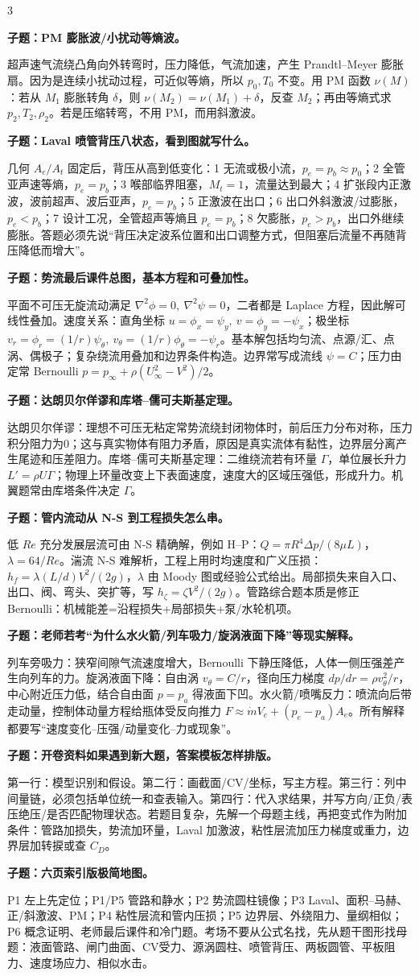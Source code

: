\documentclass[a4paper]{article}
\newcommand{\qt}[1]{\vspace{0.25pt}\colorbox{Q}{\parbox{\dimexpr\linewidth-2\fboxsep}{\color{white}\bfseries #1}}\par}
\newcommand{\ans}[1]{\colorbox{G}{\parbox{\dimexpr\linewidth-2\fboxsep}{#1}}\par}
\begin{document}
\begin{multicols}{3}
\qt{子题：PM 膨胀波/小扰动等熵波。}
\ans{超声速气流绕凸角向外转弯时，压力降低，气流加速，产生 Prandtl--Meyer 膨胀扇。因为是连续小扰动过程，可近似等熵，所以 $p_0,T_0$ 不变。用 PM 函数 $\nu(M)$：若从 $M_1$ 膨胀转角 $\delta$，则 $\nu(M_2)=\nu(M_1)+\delta$，反查 $M_2$；再由等熵式求 $p_2,T_2,\rho_2$。若是压缩转弯，不用 PM，而用斜激波。}
\qt{子题：Laval 喷管背压八状态，看到图就写什么。}
\ans{几何 $A_e/A_t$ 固定后，背压从高到低变化：1 无流或极小流，$p_e=p_b\approx p_0$；2 全管亚声速等熵，$p_e=p_b$；3 喉部临界阻塞，$M_t=1$，流量达到最大；4 扩张段内正激波，波前超声、波后亚声，$p_e=p_b$；5 正激波在出口；6 出口外斜激波/过膨胀，$p_e<p_b$；7 设计工况，全管超声等熵且 $p_e=p_b$；8 欠膨胀，$p_e>p_b$，出口外继续膨胀。答题必须先说“背压决定波系位置和出口调整方式，但阻塞后流量不再随背压降低而增大”。}
\qt{子题：势流最后课件总图，基本方程和可叠加性。}
\ans{平面不可压无旋流动满足 $\nabla^2\phi=0,\ \nabla^2\psi=0$，二者都是 Laplace 方程，因此解可线性叠加。速度关系：直角坐标 $u=\phi_x=\psi_y,\ v=\phi_y=-\psi_x$；极坐标 $v_r=\phi_r=(1/r)\psi_\theta,\ v_\theta=(1/r)\phi_\theta=-\psi_r$。基本解包括均匀流、点源/汇、点涡、偶极子；复杂绕流用叠加和边界条件构造。边界常写成流线 $\psi=C$；压力由定常 Bernoulli $p=p_\infty+\rho(U_\infty^2-V^2)/2$。}
\qt{子题：达朗贝尔佯谬和库塔--儒可夫斯基定理。}
\ans{达朗贝尔佯谬：理想不可压无粘定常势流绕封闭物体时，前后压力分布对称，压力积分阻力为0；这与真实物体有阻力矛盾，原因是真实流体有黏性，边界层分离产生尾迹和压差阻力。库塔--儒可夫斯基定理：二维绕流若有环量 $\Gamma$，单位展长升力 $L'=\rho U\Gamma$；物理上环量改变上下表面速度，速度大的区域压强低，形成升力。机翼题常由库塔条件决定 $\Gamma$。}
\qt{子题：管内流动从 N-S 到工程损失怎么串。}
\ans{低 $Re$ 充分发展层流可由 N-S 精确解，例如 H--P：$Q=\pi R^4\Delta p/(8\mu L)$，$\lambda=64/Re$。湍流 N-S 难解析，工程上用时均速度和广义压损：$h_f=\lambda(L/d)V^2/(2g)$，$\lambda$ 由 Moody 图或经验公式给出。局部损失来自入口、出口、阀、弯头、突扩等，写 $h_\zeta=\zeta V^2/(2g)$。管路综合题本质是修正 Bernoulli：机械能差=沿程损失+局部损失+泵/水轮机项。}
\qt{子题：老师若考“为什么水火箭/列车吸力/旋涡液面下降”等现实解释。}
\ans{列车旁吸力：狭窄间隙气流速度增大，Bernoulli 下静压降低，人体一侧压强差产生向列车的力。旋涡液面下降：自由涡 $v_\theta=C/r$，径向压力梯度 $dp/dr=\rho v_\theta^2/r$，中心附近压力低，结合自由面 $p=p_a$ 得液面下凹。水火箭/喷嘴反力：喷流向后带走动量，控制体动量方程给瓶体受反向推力 $F\approx\dot m V_e+(p_e-p_a)A_e$。所有解释都要写“速度变化--压强/动量变化--力或现象”。}
\qt{子题：开卷资料如果遇到新大题，答案模板怎样排版。}
\ans{第一行：模型识别和假设。第二行：画截面/CV/坐标，写主方程。第三行：列中间量链，必须包括单位统一和查表输入。第四行：代入求结果，并写方向/正负/表压绝压/是否匹配物理状态。若题目复杂，先解一个母题主线，再把变式作为附加条件：管路加损失，势流加环量，Laval 加激波，粘性层流加压力梯度或重力，边界层加转捩或查 $C_D$。}
\qt{子题：六页索引版极简地图。}
\ans{P1 左上先定位；P1/P5 管路和静水；P2 势流圆柱镜像；P3 Laval、面积--马赫、正/斜激波、PM；P4 粘性层流和管内压损；P5 边界层、外绕阻力、量纲相似；P6 概念证明、老师最后课件和冷门题。考场不要从公式名找，先从题干图形找母题：液面管路、闸门曲面、CV受力、源涡圆柱、喷管背压、两板圆管、平板阻力、速度场应力、相似水击。}


\end{multicols}
\end{document}
